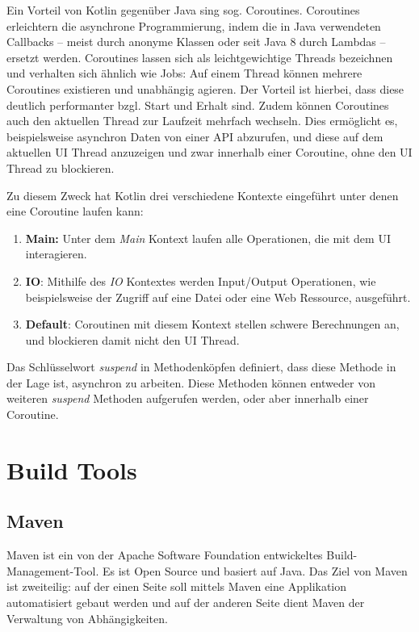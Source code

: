 				Ein Vorteil von Kotlin gegenüber Java sing sog. Coroutines. Coroutines erleichtern die asynchrone Programmierung, indem die in Java verwendeten Callbacks -- meist durch anonyme Klassen oder seit Java 8 durch Lambdas -- ersetzt werden. Coroutines lassen sich als leichtgewichtige Threads bezeichnen und verhalten sich ähnlich wie Jobs: Auf einem Thread können mehrere Coroutines existieren und unabhängig agieren. Der Vorteil ist hierbei, dass diese deutlich performanter bzgl. Start und Erhalt sind. Zudem können Coroutines auch den aktuellen Thread zur Laufzeit mehrfach wechseln. Dies ermöglicht es, beispielsweise asynchron Daten von einer API abzurufen, und diese auf dem aktuellen UI Thread anzuzeigen und zwar innerhalb einer Coroutine, ohne den UI Thread zu blockieren. 
				
				Zu diesem Zweck hat Kotlin drei verschiedene Kontexte eingeführt unter denen eine Coroutine laufen kann:
				
				\begin{enumerate}
					\item 
						\textbf{Main:} Unter dem \textit{Main} Kontext laufen alle Operationen, die mit dem \acs{UI} interagieren. 
					\item 
						\textbf{IO}: Mithilfe des \textit{\acs{IO}} Kontextes werden Input/Output Operationen, wie beispielsweise der Zugriff auf eine Datei oder eine Web Ressource, ausgeführt.
					\item 
						\textbf{Default}: Coroutinen mit diesem Kontext stellen schwere Berechnungen an, und blockieren damit nicht den \acs{UI} Thread.
				\end{enumerate}
				
				Das Schlüsselwort \textit{suspend} in Methodenköpfen definiert, dass diese Methode in der Lage ist, asynchron zu arbeiten. Diese Methoden können entweder von weiteren \textit{suspend} Methoden aufgerufen werden, oder aber innerhalb einer Coroutine.
				
	\section{Build Tools} %
	
		\subsection{Maven} %
			
			 Maven ist ein von der Apache Software Foundation entwickeltes Build-Management-Tool. Es ist Open Source und basiert auf Java. Das Ziel von Maven ist zweiteilig: auf der einen Seite soll mittels Maven eine Applikation automatisiert gebaut werden und auf der anderen Seite dient Maven der Verwaltung von Abhängigkeiten. 
			 
